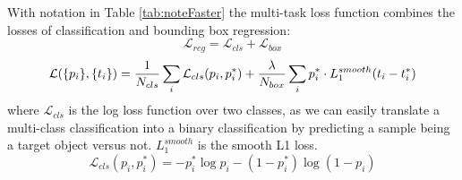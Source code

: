 With notation in Table \ref{tab:noteFaster} the multi-task loss function combines the losses of classification and bounding box regression:
\begin{equation}
	\mathcal{L}_{reg} = \mathcal{L}_{cls} + \mathcal{L}_{box}
\end{equation}
\begin{equation}
	\mathcal{L}(\{p_i\}, \{t_i\})= \frac{1}{N_{cls}} \sum_i \mathcal{L}_{cls} (p_i, p^*_i) + \frac{\lambda}{N_{box}} \sum_i p^*_i \cdot L_1^{smooth}(t_i - t^*_i) \\
\end{equation}
where \(\mathcal{L}_{cls}\) is the log loss function over two classes, as we can easily translate a multi-class classification into a binary classification by predicting a sample being a target object versus not. \(L_1^{smooth}\) is the smooth L1 loss.
\begin{equation}
	\mathcal{L}_{cls} (p_i, p^*_i) = - p^*_i \log p_i - (1 - p^*_i) \log (1 - p_i)
\end{equation}
